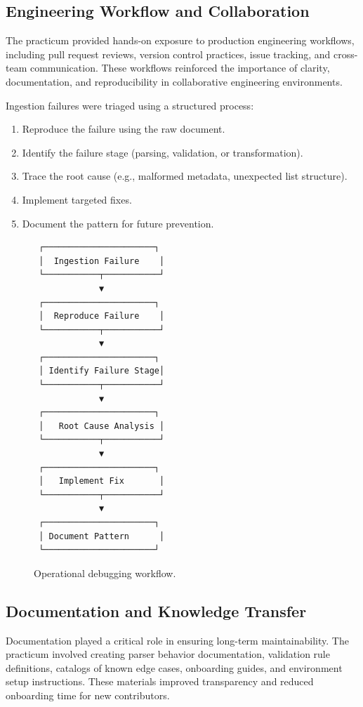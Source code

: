 \documentclass[sigconf]{acmart}
\begin{document}
\subsection{Engineering Workflow and Collaboration}

The practicum provided hands-on exposure to production engineering workflows, including pull request reviews, version control practices, issue tracking, and cross-team communication. These workflows reinforced the importance of clarity, documentation, and reproducibility in collaborative engineering environments.

Ingestion failures were triaged using a structured process:
\begin{enumerate}
    \item Reproduce the failure using the raw document.
    \item Identify the failure stage (parsing, validation, or transformation).
    \item Trace the root cause (e.g., malformed metadata, unexpected list structure).
    \item Implement targeted fixes.
    \item Document the pattern for future prevention.
\end{enumerate}

\begin{figure}[h]
\centering
\begin{verbatim}
 ┌──────────────────────┐
 │  Ingestion Failure    │
 └───────────┬───────────┘
             ▼
 ┌──────────────────────┐
 │  Reproduce Failure    │
 └───────────┬───────────┘
             ▼
 ┌──────────────────────┐
 │ Identify Failure Stage│
 └───────────┬───────────┘
             ▼
 ┌──────────────────────┐
 │   Root Cause Analysis │
 └───────────┬───────────┘
             ▼
 ┌──────────────────────┐
 │   Implement Fix       │
 └───────────┬───────────┘
             ▼
 ┌──────────────────────┐
 │ Document Pattern      │
 └──────────────────────┘
\end{verbatim}
\caption{Operational debugging workflow.}
\end{figure}

\subsection{Documentation and Knowledge Transfer}

Documentation played a critical role in ensuring long-term maintainability. The practicum involved creating parser behavior documentation, validation rule definitions, catalogs of known edge cases, onboarding guides, and environment setup instructions. These materials improved transparency and reduced onboarding time for new contributors.
\end{document}
